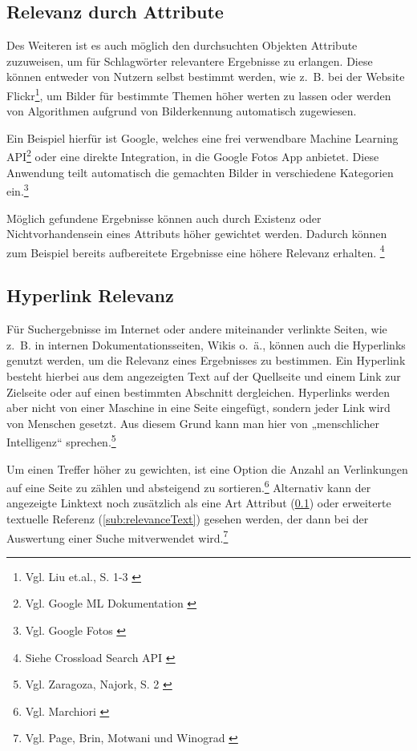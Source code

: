\subsection{Relevanz durch Attribute}
\label{sub:relevanceAttribute}
Des Weiteren ist es auch möglich den durchsuchten Objekten Attribute zuzuweisen, um für Schlagwörter relevantere Ergebnisse zu erlangen.
Diese können entweder von Nutzern selbst bestimmt werden, wie z. B. bei der Website Flickr\footnote{Vgl. Liu et.al., S. 1-3 \cite{liu2009}}, um Bilder für bestimmte Themen höher werten zu lassen oder werden von Algorithmen aufgrund von Bilderkennung automatisch zugewiesen.

Ein Beispiel hierfür ist Google, welches eine frei verwendbare Machine Learning API\footnote{Vgl. Google ML Dokumentation \cite{googledevelopers2022}} oder eine direkte Integration, in die Google Fotos App anbietet. Diese Anwendung teilt automatisch die gemachten Bilder in verschiedene Kategorien ein.\footnote{Vgl. Google Fotos \cite{googlephotos2022}}

Möglich gefundene Ergebnisse können auch durch Existenz oder Nichtvorhandensein eines Attributs höher gewichtet werden.
Dadurch können zum Beispiel bereits aufbereitete Ergebnisse eine höhere Relevanz erhalten. \footnote{Siehe Crossload Search API \cite{crossload2022}}

\subsection{Hyperlink Relevanz}
\label{sub:relevanceHyperlink}
Für Suchergebnisse im Internet oder andere miteinander verlinkte Seiten, wie z. B. in internen Dokumentationsseiten, Wikis o. ä., können auch die Hyperlinks genutzt werden, um die Relevanz eines Ergebnisses zu bestimmen.
Ein Hyperlink besteht hierbei aus dem angezeigten Text auf der Quellseite und einem Link zur Zielseite oder auf einen bestimmten Abschnitt dergleichen.
Hyperlinks werden aber nicht von einer Maschine in eine Seite eingefügt, sondern jeder Link wird von Menschen gesetzt.
Aus diesem Grund kann man hier von „menschlicher Intelligenz“ sprechen.\footnote{Vgl. Zaragoza, Najork, S. 2 \cite{zaragoza2018}}

Um einen Treffer höher zu gewichten, ist eine Option die Anzahl an Verlinkungen auf eine Seite zu zählen und absteigend zu sortieren.\footnote{Vgl. Marchiori \cite{marchiori1997}}
Alternativ kann der angezeigte Linktext noch zusätzlich als eine Art Attribut (\ref{sub:relevanceAttribute}) oder erweiterte textuelle Referenz (\ref{sub:relevanceText}) gesehen werden, der dann bei der Auswertung einer Suche mitverwendet wird.\footnote{Vgl. Page, Brin, Motwani und Winograd \cite{ilprints422}}

